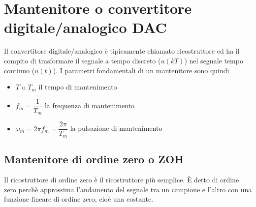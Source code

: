 \documentclass[a4paper]{report}
\begin{document}
\section{Mantenitore o convertitore digitale/analogico DAC}
Il convertitore digitale/analogico \`e tipicamente chiamato
ricostruttore ed ha il compito di trasformare il segnale a tempo
discreto ($u(kT)$) nel segnale tempo continuo ($u(t)$). I parametri
fondamentali di un mantenitore sono quindi
\begin{itemize}
\item $T$ o $T_m$ il tempo di mantenimento
\item $f_m = \dfrac{1}{T_m}$ la frequenza di mantenimento
\item $\omega_m = 2 \pi f_m = \dfrac{2 \pi}{T_m}$ la pulsazione di
  mantenimento
\end{itemize}

\subsection{Mantenitore di ordine zero o
  ZOH}\label{ricostruttoreOrdineZeroAccenni} 
Il ricostruttore di ordine zero \`e il ricostruttore pi\`u
semplice. \`E detto di ordine zero perch\`e approssima l'andamento del
segnale tra un campione e l'altro con una funzione lineare di ordine
zero, cio\`e una costante.
\end{document}
